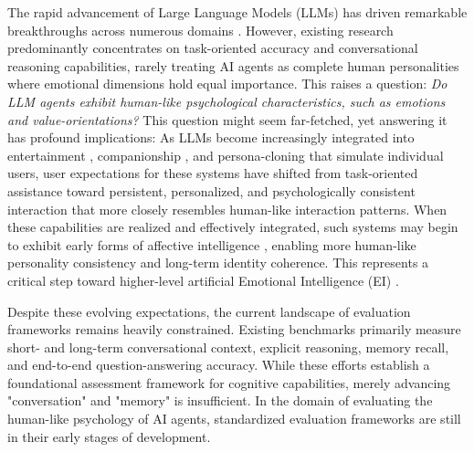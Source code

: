 \documentclass{article}
\begin{document}
The rapid advancement of Large Language Models (LLMs) has driven remarkable breakthroughs across numerous domains \cite{anthropic2026claudeopus47,openai2026gpt55,google2026gemini31pro}. However, existing research predominantly concentrates on task-oriented accuracy and conversational reasoning capabilities, rarely treating AI agents as complete human personalities where emotional dimensions hold equal importance. This raises a question: \emph{Do LLM agents exhibit human-like psychological characteristics, such as emotions and value-orientations?} This question might seem far-fetched, yet answering it has profound implications: As LLMs become increasingly integrated into entertainment \cite{chen2024persona,tseng2024two}, companionship \cite{maples2024loneliness,phang2025investigating}, and persona-cloning \cite{wei2025ai, lee2026creating} that simulate individual users, user expectations for these systems have shifted from task-oriented assistance toward persistent, personalized, and psychologically consistent interaction that more closely resembles human-like interaction patterns. When these capabilities are realized and effectively integrated, such systems may begin to exhibit early forms of affective intelligence \cite{marcus2000affective}, enabling more human-like personality consistency and long-term identity coherence. This represents a critical step toward higher-level artificial Emotional Intelligence (EI) \cite{salovey1990emotional}.

Despite these evolving expectations, the current landscape of evaluation frameworks remains heavily constrained. Existing benchmarks primarily measure short- and long-term conversational context, explicit reasoning, memory recall, and end-to-end question-answering accuracy. While these efforts establish a foundational assessment framework for cognitive capabilities, merely advancing "conversation" and "memory" is insufficient. In the domain of evaluating the human-like psychology of AI agents, standardized evaluation frameworks are still in their early stages of development.
\end{document}
